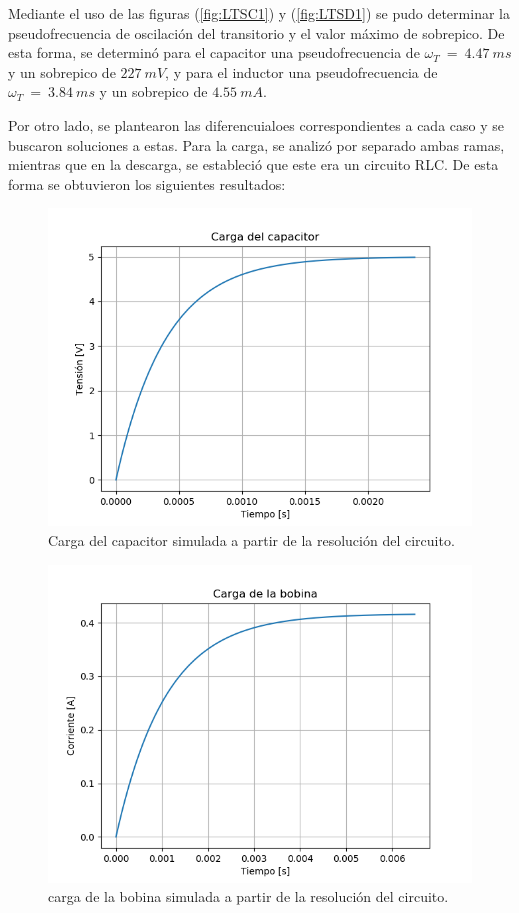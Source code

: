 \documentclass[a4paper]{article}
\begin{document}
Mediante el uso de las figuras (\ref{fig:LTSC1}) y (\ref{fig:LTSD1}) se pudo determinar la pseudofrecuencia de oscilación del transitorio y el valor máximo de sobrepico. De esta forma, se determinó para el capacitor una pseudofrecuencia de ${\omega}_{T} \ = \ 4.47 \ ms$ y un sobrepico de $227 \ mV$, y para el inductor una pseudofrecuencia de ${\omega}_{T} \ = \ 3.84 \ ms$ y un sobrepico de $4.55 \ mA$.

Por otro lado, se plantearon las  diferencuialoes correspondientes a cada caso y se buscaron soluciones a estas. Para la carga, se analizó por separado ambas ramas, mientras que en la descarga, se estableció que este era un circuito RLC. De esta forma se obtuvieron los siguientes resultados:

\begin{figure}[H]
	\centering
	\includegraphics[width=\textwidth]{LTSpice-CargaCSim}
	\caption{Carga del capacitor simulada a partir de la resolución del circuito.}
	\label{fig:LTSCCS}
\end{figure}

\begin{figure}[H]
	\centering
	\includegraphics[width=\textwidth]{LTSpice-CargaLSim}
	\caption{carga de la bobina simulada a partir de la resolución del circuito.}
	\label{fig:LTSCLS}
\end{figure}
\end{document}
